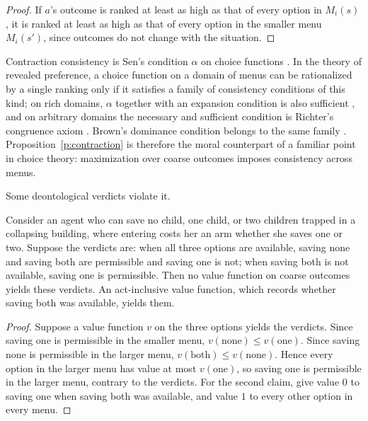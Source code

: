 \documentclass{situationist-preprint}
\begin{document}
\begin{proof}
If $a$'s outcome is ranked at least as high as that of every option in $M_i(s)$, it is ranked at least as high as that of every option in the smaller menu $M_i(s')$, since outcomes do not change with the situation.
\end{proof}

Contraction consistency is Sen's condition $\alpha$ on choice functions \citep{Sen1971}. In the theory of revealed preference, a choice function on a domain of menus can be rationalized by a single ranking only if it satisfies a family of consistency conditions of this kind; on rich domains, $\alpha$ together with an expansion condition is also sufficient \citep{Arrow1959,Sen1971}, and on arbitrary domains the necessary and sufficient condition is Richter's congruence axiom \citep{Richter1966}. Brown's dominance condition belongs to the same family \citep{Brown2011}. Proposition~\ref{p:contraction} is therefore the moral counterpart of a familiar point in choice theory: maximization over coarse outcomes imposes consistency across menus.

Some deontological verdicts violate it.

\begin{proposition}\label{p:horton}
Consider an agent who can save no child, one child, or two children trapped in a collapsing building, where entering costs her an arm whether she saves one or two. Suppose the verdicts are: when all three options are available, saving none and saving both are permissible and saving one is not; when saving both is not available, saving one is permissible. Then no value function on coarse outcomes yields these verdicts. An act-inclusive value function, which records whether saving both was available, yields them.
\end{proposition}

\begin{proof}
Suppose a value function $v$ on the three options yields the verdicts. Since saving one is permissible in the smaller menu, $v(\text{none}) \leq v(\text{one})$. Since saving none is permissible in the larger menu, $v(\text{both}) \leq v(\text{none})$. Hence every option in the larger menu has value at most $v(\text{one})$, so saving one is permissible in the larger menu, contrary to the verdicts. For the second claim, give value $0$ to saving one when saving both was available, and value $1$ to every other option in every menu.
\end{proof}
\end{document}
